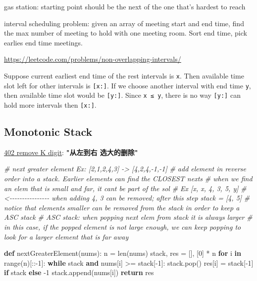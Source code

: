 \documentclass[
]{article}
\newenvironment{Shaded}{}{}
\newcommand{\BuiltInTok}[1]{#1}
\newcommand{\CommentTok}[1]{\textcolor[rgb]{0.38,0.63,0.69}{\textit{#1}}}
\newcommand{\ControlFlowTok}[1]{\textcolor[rgb]{0.00,0.44,0.13}{\textbf{#1}}}
\newcommand{\DecValTok}[1]{\textcolor[rgb]{0.25,0.63,0.44}{#1}}
\newcommand{\KeywordTok}[1]{\textcolor[rgb]{0.00,0.44,0.13}{\textbf{#1}}}
\newcommand{\NormalTok}[1]{#1}
\newcommand{\OperatorTok}[1]{\textcolor[rgb]{0.40,0.40,0.40}{#1}}
\begin{document}
gas station: starting point should be the next of the one that's hardest
to reach

interval scheduling problem: given an array of meeting start and end
time, find the max number of meeting to hold with one meeting room. Sort
end time, pick earlies end time meetings.

\url{https://leetcode.com/problems/non-overlapping-intervals/}

Suppose current earliest end time of the rest intervals is \texttt{x}.
Then available time slot left for other intervals is \texttt{{[}x:{]}}.
If we choose another interval with end time \texttt{y}, then available
time slot would be \texttt{{[}y:{]}}. Since \texttt{x\ ≤\ y}, there is
no way \texttt{{[}y:{]}} can hold more intervals then \texttt{{[}x:{]}}.

\hypertarget{monotonic-stack}{%
\subsection{Monotonic Stack}\label{monotonic-stack}}

\href{https://leetcode.com/problems/remove-k-digits/}{402 remove K
digit}: \textbf{"从左到右 选大的删除"}

\begin{Shaded}
\begin{Highlighting}[]
\CommentTok{\# next greater element Ex: [2,1,2,4,3] {-}\textgreater{} [4,2,4,{-}1,{-}1]}
\CommentTok{\# add element in reverse order into a stack. Earlier elements can find the CLOSEST \textquotesingle{}nexts\textquotesingle{}}
\CommentTok{\# when we find an elem that is small and far, it can\textquotesingle{}t be part of the sol}
\CommentTok{\# Ex [x, x, 4, 3, 5, y]}
\CommentTok{\#    \textless{}{-}{-}{-}{-}{-}{-}{-}{-}{-}{-}{-}{-}{-}{-}{-}{-} when adding 4, 3 can be removed; after this step stack = [4, 5] }
\CommentTok{\# notice that elements smaller can be removed from the stack in order to keep a ASC stack}
\CommentTok{\# ASC stack: when popping next elem from stack it is always larger}
\CommentTok{\# in this case, if the popped element is not large enough, we can keep popping to look for a larger element that is far away}

\KeywordTok{def}\NormalTok{ nextGreaterElement(nums): }
\NormalTok{  n }\OperatorTok{=} \BuiltInTok{len}\NormalTok{(nums)}
\NormalTok{  stack, res }\OperatorTok{=}\NormalTok{ [], [}\DecValTok{0}\NormalTok{] }\OperatorTok{*}\NormalTok{ n}
  \ControlFlowTok{for}\NormalTok{ i }\KeywordTok{in} \BuiltInTok{range}\NormalTok{(n)[::}\OperatorTok{{-}}\DecValTok{1}\NormalTok{]:}
    \ControlFlowTok{while}\NormalTok{ stack }\KeywordTok{and}\NormalTok{ nums[i] }\OperatorTok{\textgreater{}=}\NormalTok{ stack[}\OperatorTok{{-}}\DecValTok{1}\NormalTok{]: stack.pop()}
\NormalTok{    res[i] }\OperatorTok{=}\NormalTok{ stack[}\OperatorTok{{-}}\DecValTok{1}\NormalTok{] }\ControlFlowTok{if}\NormalTok{ stack }\ControlFlowTok{else} \OperatorTok{{-}}\DecValTok{1}
\NormalTok{    stack.append(nums[i])}
  \ControlFlowTok{return}\NormalTok{ res}
\end{Highlighting}
\end{Shaded}
\end{document}
